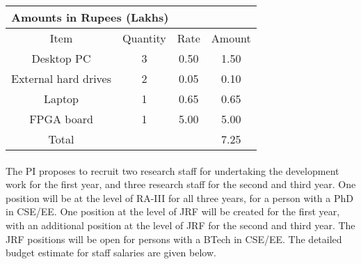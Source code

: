 \documentclass[12pt]{article}
\begin{document}

\begin{center}
\begin{tabular}{|c|c|c|c|}
\multicolumn{4}{l}{\bf Amounts in Rupees (Lakhs)}\\
\hline
Item & Quantity & Rate & Amount \\
\hline
Desktop PC & 3 & 0.50 & 1.50 \\
External hard drives & 2 & 0.05 & 0.10 \\
Laptop & 1 & 0.65 & 0.65 \\
FPGA board & 1 & 5.00 & 5.00 \\
\hline
Total & & & 7.25 \\
\hline
\end{tabular}
\end{center}

\newpage
{}

\paragraph{}The PI proposes to recruit two research staff for
undertaking the development work for the first year, and three
research staff for the second and third year. One position will be at
the level of RA-III for all three years, for a person with a PhD in
CSE/EE. One position at the level of JRF will be created for the first
year, with an additional position at the level of JRF for the second
and third year. The JRF positions will be open for persons with a
BTech in CSE/EE. The detailed budget estimate for staff salaries are
given below.
\end{document}
